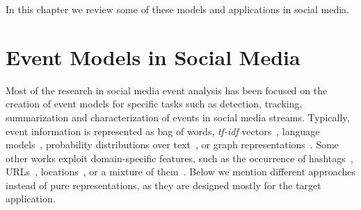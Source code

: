 In this chapter we review some of these models and applications in social media.


\section{Event Models in Social Media}

Most of the research in social media event analysis has been focused on
the creation of event models for specific tasks such as detection, tracking,
summarization and characterization of events in social media streams. 
%
Typically, event information is represented as bag of words, {\em tf-idf}
vectors~\cite{tfidf,Marcus:2011:TAV:1978942.1978975}, language
models~\cite{zellers2019neuralfakenews}, probability distributions over
text~\cite{o2010tweetmotif,Hong:2010:EST:1964858.1964870,zhao2011comparing,Mehrotra:2013:ILT:2484028.2484166},
or graph
representations~\cite{Setty:2018:ENE:3209978.3210136,Lee:2013:KSK:2487575.2487711,Lee:2014:CCS:2661829.2661859}.
%
Some other works exploit domain-specific features, such as the occurrence of
hashtags~\cite{Kamath:2013:SDO:2488388.2488447},
URLs~\cite{Alonso:2015:WCW:2740908.2745397},
locations~\cite{Abdelhaq:EvenTweet:2013}, or a mixture of them~\cite{castillo2011information}.
%
Below we mention different approaches instead of pure representations, as they
are designed mostly for the target application.
%


